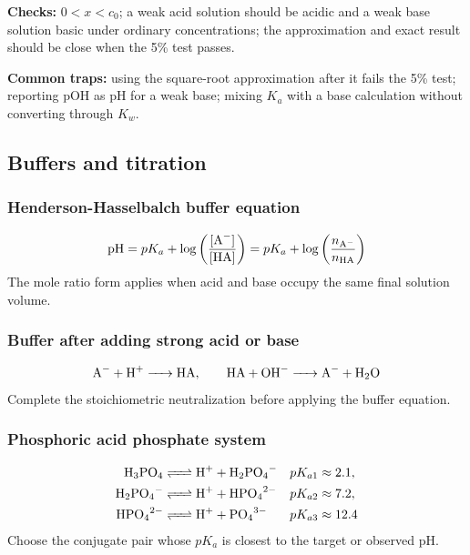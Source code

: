 \textbf{Checks:} \(0<x<c_0\); a weak acid solution should be acidic and a weak base solution basic under ordinary concentrations; the approximation and exact result should be close when the 5\% test passes.

\textbf{Common traps:} using the square-root approximation after it fails the 5\% test; reporting pOH as pH for a weak base; mixing \(K_a\) with a base calculation without converting through \(K_w\).

\subsection{Buffers and titration}

\subsubsection{Henderson-Hasselbalch buffer equation}
\begin{equation}
\mathrm{pH}=pK_a+\log\left(\frac{[\ce{A-}]}{[\ce{HA}]}\right)
=pK_a+\log\left(\frac{n_{\ce{A-}}}{n_{\ce{HA}}}\right)
\label{eq:acid:henderson-hasselbalch}
\end{equation}
The mole ratio form applies when acid and base occupy the same final solution volume.

\subsubsection{Buffer after adding strong acid or base}
\begin{equation}
\ce{A- + H+ -> HA}, \qquad
\ce{HA + OH- -> A- + H2O}
\label{eq:acid:buffer-neutralization}
\end{equation}
Complete the stoichiometric neutralization before applying the buffer equation.

\subsubsection{Phosphoric acid phosphate system}
\begin{equation}
\begin{aligned}
\ce{H3PO4 &<=> H+ + H2PO4-} && pK_{a1}\approx2.1,\\
\ce{H2PO4- &<=> H+ + HPO4^2-} && pK_{a2}\approx7.2,\\
\ce{HPO4^2- &<=> H+ + PO4^3-} && pK_{a3}\approx12.4
\end{aligned}
\label{eq:acid:phosphate-pka}
\end{equation}
Choose the conjugate pair whose \(pK_a\) is closest to the target or observed pH.

